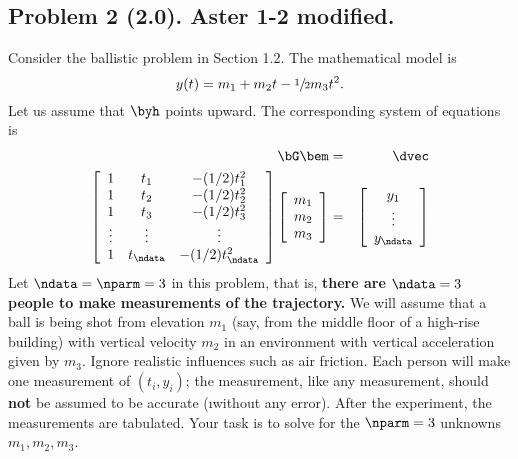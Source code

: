 \documentclass[11pt,titlepage,fleqn]{article}
\begin{document}
\subsection*{Problem 2 (2.0). Aster 1-2 modified.}

Consider the ballistic problem in Section 1.2.
The mathematical model is \citep[][Eq.~1.13]{AsterE2}
%
\begin{equation}
y(t) = m_1 + m_2 t - \sfrac{1}{2} m_3 t^2.
\label{ballistic}
\end{equation}
%
Let us assume that $\byh$ points upward.
The corresponding system of equations is
%
\begin{eqnarray}
\bG \bem &=& \dvec
\label{lsq}
\\
\left[
\begin{array}{ccc}
1 & t_1 & -(1/2)t_1^2 \\
1 & t_2 & -(1/2)t_2^2 \\
1 & t_3 & -(1/2)t_3^2 \\
\vdots & \vdots & \vdots \\
1 & t_\ndata & -(1/2)t_\ndata^2 \\
\end{array}
\right]
\left[
\begin{array}{c}
m_1 \\ m_2 \\ m_3
\end{array}
\right]
&=& 
\left[
\begin{array}{c}
y_1 \\ \vdots \\ y_\ndata
\end{array}
\right]
\end{eqnarray}
%
Let $\ndata = \nparm = 3$ in this problem, that is, {\bf there are $\ndata=3$ people to make measurements of the trajectory.}
We will assume that a ball is being shot from elevation $m_1$ (say, from the middle floor of a high-rise building) with vertical velocity $m_2$ in an environment with vertical acceleration given by $m_3$.
Ignore realistic influences such as air friction.
Each person will make one measurement of $(t_i,y_i)$; the measurement, like any measurement, should {\bf not} be assumed to be accurate (\i without any error).
After the experiment, the measurements are tabulated.
Your task is to solve for the $\nparm=3$ unknowns $m_1, m_2, m_3$.
%
\end{document}
